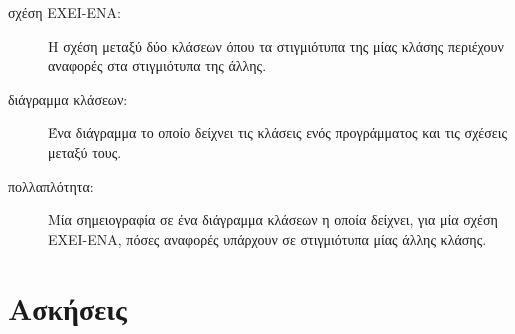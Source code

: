 \documentclass[10pt]{book}
\begin{document}
\begin{description}
\item[σχέση ΕΧΕΙ-ΕΝΑ:] Η σχέση μεταξύ δύο κλάσεων όπου τα στιγμιότυπα της μίας κλάσης 
περιέχουν αναφορές στα στιγμιότυπα της άλλης.

\item[διάγραμμα κλάσεων:] Ένα διάγραμμα το οποίο δείχνει τις κλάσεις ενός προγράμματος 
και τις σχέσεις μεταξύ τους.

\item[πολλαπλότητα:] Μία σημειογραφία σε ένα διάγραμμα κλάσεων η οποία δείχνει, για μία 
σχέση ΕΧΕΙ-ΕΝΑ, πόσες αναφορές υπάρχουν σε στιγμιότυπα μίας άλλης κλάσης.

\end{description}



\section{Ασκήσεις}
\end{document}
